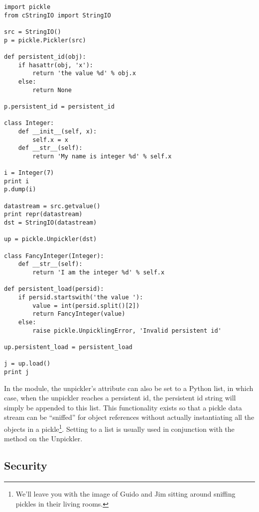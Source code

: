\begin{verbatim}
import pickle
from cStringIO import StringIO

src = StringIO()
p = pickle.Pickler(src)

def persistent_id(obj):
    if hasattr(obj, 'x'):
        return 'the value %d' % obj.x
    else:
        return None

p.persistent_id = persistent_id

class Integer:
    def __init__(self, x):
        self.x = x
    def __str__(self):
        return 'My name is integer %d' % self.x

i = Integer(7)
print i
p.dump(i)

datastream = src.getvalue()
print repr(datastream)
dst = StringIO(datastream)

up = pickle.Unpickler(dst)

class FancyInteger(Integer):
    def __str__(self):
        return 'I am the integer %d' % self.x

def persistent_load(persid):
    if persid.startswith('the value '):
        value = int(persid.split()[2])
        return FancyInteger(value)
    else:
        raise pickle.UnpicklingError, 'Invalid persistent id'

up.persistent_load = persistent_load

j = up.load()
print j
\end{verbatim}

In the  module, the unpickler's
 attribute can also be set to a Python
list, in which case, when the unpickler reaches a persistent id, the
persistent id string will simply be appended to this list.  This
functionality exists so that a pickle data stream can be ``sniffed''
for object references without actually instantiating all the objects
in a pickle\footnote{We'll leave you with the image of Guido and Jim
sitting around sniffing pickles in their living rooms.}.  Setting
 to a list is usually used in conjunction with
the  method on the Unpickler.


\subsection{Security \label{pickle-sec}}

